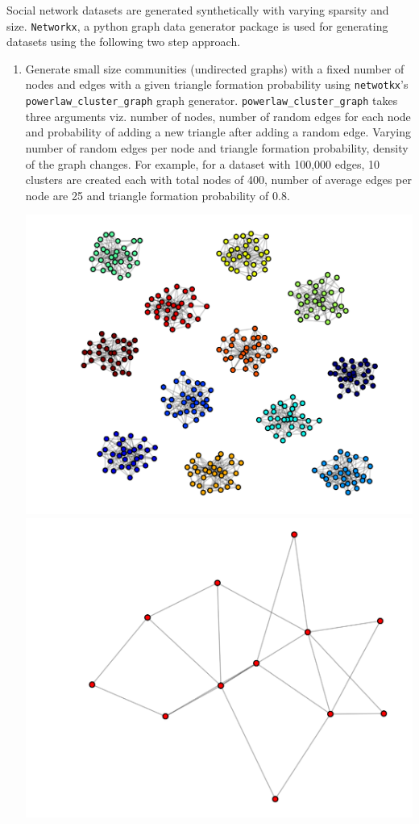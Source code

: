 Social network datasets are generated synthetically with varying sparsity and size. \texttt{Networkx}, a python graph data generator package is used for generating datasets using the following two step approach.
\begin{enumerate}
	\item
	Generate small size communities (undirected graphs) with a fixed number of nodes and edges with a given triangle formation probability using \texttt{netwotkx}'s \texttt{powerlaw\_cluster\_graph} graph generator. \texttt{powerlaw\_cluster\_graph} takes three arguments viz. number of nodes, number of random edges for each node and probability of adding a new triangle after adding a random edge. Varying number of random edges per node and triangle formation probability, density of the graph changes. For example, for a dataset with 100,000 edges, 10 clusters are created each with total nodes of 400, number of average edges per node are 25 and triangle formation probability of 0.8.\\
	\begin{center}
		\includegraphics[scale=0.22]{Images/datasetgen1.pdf}
		\includegraphics[scale=0.22]{Images/datasetgen2.pdf}

\end{center}
\end{enumerate}
